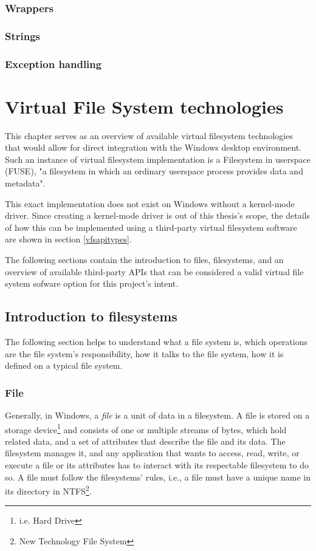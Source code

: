 \subsection*{Wrappers}

\subsection*{Strings}

\subsection*{Exception handling}


\chapter{Virtual File System technologies}
\label{ch3}
This chapter serves as an overview of available virtual filesystem technologies that would allow for direct integration with the Windows desktop environment. Such an instance of virtual filesystem implementation is a Filesystem in userspace (FUSE), "a filesystem in which an ordinary userspace process provides data and metadata".\cite{FUSE}

This exact implementation does not exist on Windows without a kernel-mode driver\cite{WinKernelFS}. Since creating a kernel-mode driver is out of this thesis's scope, the details of how this can be implemented using a third-party virtual filesystem software are shown in section \ref{vfsapitypes}.

The following sections contain the introduction to files, filesystems, and an overview of available third-party APIs that can be considered a valid virtual file system sofware option for this project's intent.

\section{Introduction to filesystems}
The following section helps to understand what a file system is, which operations are the file system's responsibility, how it talks to the file system, how it is defined on a typical file system.

\subsection*{File}
\label{file}
Generally, in Windows, a \textit{file} is a unit of data in a filesystem. A file is stored on a storage device\footnote{i.e. Hard Drive} and consists of one or multiple streams of bytes, which hold related data, and a set of attributes that describe the file and its data. The filesystem manages it, and any application that wants to access, read, write, or execute a file or its attributes has to interact with its respectable filesystem to do so. A file must follow the filesystems' rules, i.e., a file must have a unique name in its directory in NTFS\footnote{New Technology File System}.\cite{FilesAndClusters}

